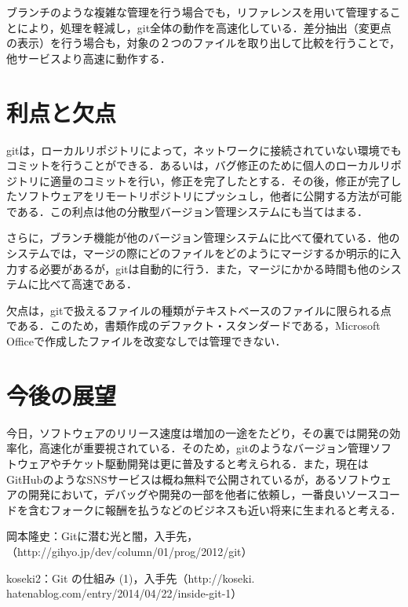 \documentclass[a4j,9pt,twocolumn]{jsarticle}
\begin{document}
ブランチのような複雑な管理を行う場合でも，リファレンスを用いて管理することにより，処理を軽減し，git全体の動作を高速化している．差分抽出（変更点の表示）を行う場合も，対象の２つのファイルを取り出して比較を行うことで，他サービスより高速に動作する．

\section{利点と欠点}
gitは，ローカルリポジトリによって，ネットワークに接続されていない環境でもコミットを行うことができる．あるいは，バグ修正のために個人のローカルリポジトリに適量のコミットを行い，修正を完了したとする．その後，修正が完了したソフトウェアをリモートリポジトリにプッシュし，他者に公開する方法が可能である．この利点は他の分散型バージョン管理システムにも当てはまる．

さらに，ブランチ機能が他のバージョン管理システムに比べて優れている．他のシステムでは，マージの際にどのファイルをどのようにマージするか明示的に入力する必要があるが，gitは自動的に行う．また，マージにかかる時間も他のシステムに比べて高速である．

欠点は，gitで扱えるファイルの種類がテキストベースのファイルに限られる点である．このため，書類作成のデファクト・スタンダードである，Microsoft Officeで作成したファイルを改変なしでは管理できない．

\section{今後の展望}
今日，ソフトウェアのリリース速度は増加の一途をたどり，その裏では開発の効率化，高速化が重要視されている．そのため，gitのようなバージョン管理ソフトウェアやチケット駆動開発は更に普及すると考えられる．また，現在はGitHubのようなSNSサービスは概ね無料で公開されているが，あるソフトウェアの開発において，デバッグや開発の一部を他者に依頼し，一番良いソースコードを含むフォークに報酬を払うなどのビジネスも近い将来に生まれると考える．

\small
\begin{thebibliography}{99}
岡本隆史：Gitに潜む光と闇，入手先，（http://gihyo.jp/dev/column/01/prog/2012/git）

koseki2：Git の仕組み (1)，入手先（http://koseki.\\hatenablog.com/entry/2014/04/22/inside-git-1）
\end{thebibliography}
\end{document}
